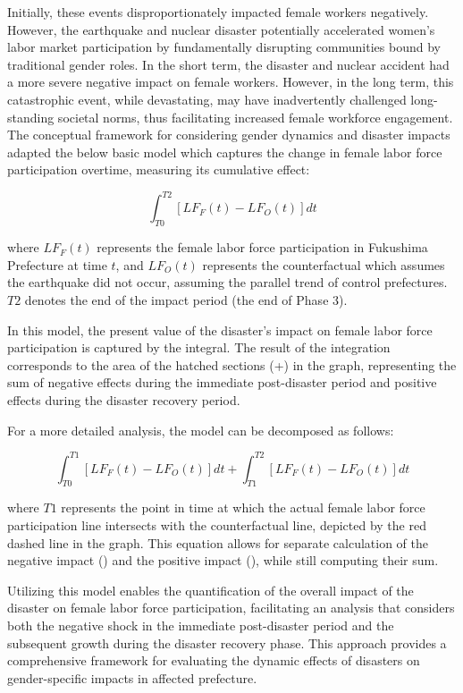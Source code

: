 \documentclass[12pt,halfline,a4paper]{ouparticle}
\begin{document}
Initially, these events disproportionately impacted female workers negatively. However, the earthquake and nuclear disaster potentially accelerated women's labor market participation by fundamentally disrupting communities bound by traditional gender roles. In the short term, the disaster and nuclear accident had a more severe negative impact on female workers. However, in the long term, this catastrophic event, while devastating, may have inadvertently challenged long-standing societal norms, thus facilitating increased female workforce engagement. The conceptual framework for considering gender dynamics and disaster impacts adapted the below basic model which captures the change in female labor force participation overtime, measuring its cumulative effect:

\begin{equation}
\int_{T0}^{T2} [LF_F(t) - LF_O(t)] dt
\end{equation}

where $LF_F(t)$ represents the female labor force participation in Fukushima Prefecture at time $t$, and $LF_O(t)$ represents the counterfactual which assumes the earthquake did not occur, assuming the parallel trend of control prefectures. $T2$ denotes the end of the impact period (the end of Phase 3).

In this model, the present value of the disaster's impact on female labor force participation is captured by the integral. The result of the integration corresponds to the area of the hatched sections (+) in the graph, representing the sum of negative effects during the immediate post-disaster period and positive effects during the disaster recovery period.

For a more detailed analysis, the model can be decomposed as follows:

\begin{equation}
\int_{T0}^{T1} [LF_F(t) - LF_O(t)] dt + \int_{T1}^{T2} [LF_F(t) - LF_O(t)] dt
\end{equation}

where $T1$ represents the point in time at which the actual female labor force participation line intersects with the counterfactual line, depicted by the red dashed line in the graph. This equation allows for separate calculation of the negative impact () and the positive impact (), while still computing their sum.

Utilizing this model enables the quantification of the overall impact of the disaster on female labor force participation, facilitating an analysis that considers both the negative shock in the immediate post-disaster period and the subsequent growth during the disaster recovery phase. This approach provides a comprehensive framework for evaluating the dynamic effects of disasters on gender-specific impacts in affected prefecture.
\end{document}
